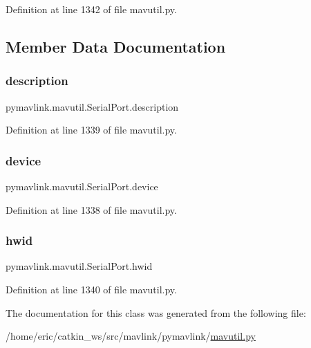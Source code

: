 Definition at line 1342 of file mavutil.\+py.



\subsection{Member Data Documentation}
\mbox{\label{classpymavlink_1_1mavutil_1_1SerialPort_ac3943442497a938ab8be65fcfce4eb62}} 
\subsubsection{\texorpdfstring{description}{description}}
{\footnotesize\ttfamily pymavlink.\+mavutil.\+Serial\+Port.\+description}



Definition at line 1339 of file mavutil.\+py.

\mbox{\label{classpymavlink_1_1mavutil_1_1SerialPort_adab21d2b77fd40dd3f44247c56756546}} 
\subsubsection{\texorpdfstring{device}{device}}
{\footnotesize\ttfamily pymavlink.\+mavutil.\+Serial\+Port.\+device}



Definition at line 1338 of file mavutil.\+py.

\mbox{\label{classpymavlink_1_1mavutil_1_1SerialPort_a582a43548e6708f07c7c8daaa73b8980}} 
\subsubsection{\texorpdfstring{hwid}{hwid}}
{\footnotesize\ttfamily pymavlink.\+mavutil.\+Serial\+Port.\+hwid}



Definition at line 1340 of file mavutil.\+py.



The documentation for this class was generated from the following file\+:\begin{DoxyCompactItemize}
\item 
/home/eric/catkin\+\_\+ws/src/mavlink/pymavlink/\mbox{\hyperlink{mavutil_8py}{mavutil.\+py}}\end{DoxyCompactItemize}
